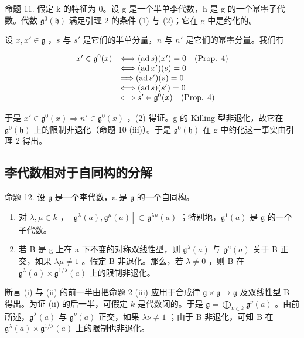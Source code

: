 命题 11. 假定 k 的特征为 0。设 g 是一个半单李代数，h 是 g 的一个幂零子代数。代数 \(\mathfrak{g}^{0}(\mathfrak{h})\) 满足引理 2 的条件 (1) 与 (2)；它在 g 中是约化的。

设 \(x, x' \in \mathfrak{g}\) ，\(s\) 与 \(s'\) 是它们的半单分量，\(n\) 与 \(n'\) 是它们的幂零分量。我们有

\[
\begin{array}{r l} x ^ {\prime} \in \mathfrak {g} ^ {0} (x) & \Longleftrightarrow (\operatorname{ad} s) (x ^ {\prime}) = 0 \quad \text {(Prop. 4)} \\ & \Longleftrightarrow (\operatorname{ad} x ^ {\prime}) (s) = 0 \\ & \Longrightarrow (\operatorname{ad} s ^ {\prime}) (s) = 0 \\ & \Longleftrightarrow (\operatorname{ad} s) (s ^ {\prime}) = 0 \\ & \Longleftrightarrow s ^ {\prime} \in \mathfrak {g} ^ {0} (x) \quad \text {(Prop. 4)} \end{array}
\]

于是 \(x' \in \mathfrak{g}^{0}(x) \Rightarrow n' \in \mathfrak{g}^{0}(x)\) ，(2) 得证。g 的 Killing 型非退化，故它在 \(\mathfrak{g}^{0}(\mathfrak{h})\) 上的限制非退化（命题 10 (iii)）。于是 \(\mathfrak{g}^{0}(\mathfrak{h})\) 在 g 中约化这一事实由引理 2 得出。

\subsection{李代数相对于自同构的分解}

命题 12. 设 \(\mathfrak{g}\) 是一个李代数，a 是 \(\mathfrak{g}\) 的一个自同构。

\begin{enumerate}
\def\labelenumi{(\roman{enumi})}
\item
  对 \(\lambda, \mu \in k\) ，\([\mathfrak{g}^{\lambda}(a), \mathfrak{g}^{\mu}(a)] \subset \mathfrak{g}^{\lambda \mu}(a)\) ；特别地，\(\mathfrak{g}^1(a)\) 是 \(\mathfrak{g}\) 的一个子代数。
\item
  若 B 是 g 上在 a 下不变的对称双线性型，则 \(\mathfrak{g}^{\lambda}(a)\) 与 \(\mathfrak{g}^{\mu}(a)\) 关于 B 正交，如果 \(\lambda\mu \neq 1\) 。假定 B 非退化。那么，若 \(\lambda \neq 0\) ，则 B 在 \(\mathfrak{g}^{\lambda}(a) \times \mathfrak{g}^{1/\lambda}(a)\) 上的限制非退化。
\end{enumerate}

断言 (i) 与 (ii) 的前一半由把命题 2 (iii) 应用于合成律 \(\mathfrak{g} \times \mathfrak{g} \to \mathfrak{g}\) 及双线性型 B 得出。为证 (ii) 的后一半，可假定 \(k\) 是代数闭的。于是 \(\mathfrak{g} = \bigoplus_{\nu \in k} \mathfrak{g}^{\nu}(a)\) 。由前所述，\(\mathfrak{g}^{\lambda}(a)\) 与 \(\mathfrak{g}^{\nu}(a)\) 正交，如果 \(\lambda \nu \neq 1\) ；由于 B 非退化，可知 B 在 \(\mathfrak{g}^{\lambda}(a) \times \mathfrak{g}^{1/\lambda}(a)\) 上的限制也非退化。

